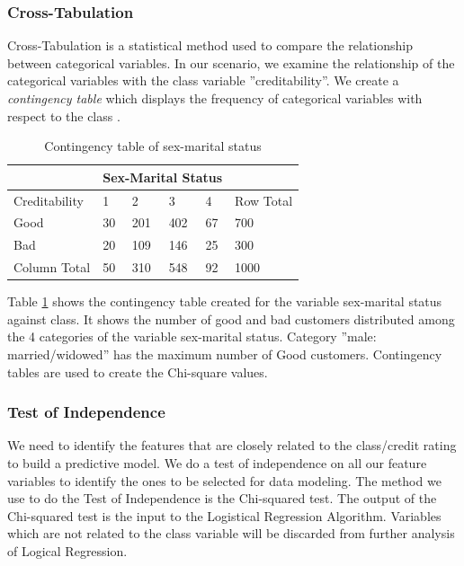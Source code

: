 \documentclass[sigconf]{acmart}
\begin{document}
\subsubsection{Cross-Tabulation}

Cross-Tabulation is a statistical method used to compare the relationship between categorical variables. In our scenario, we examine the relationship of the categorical variables with the class variable ''creditability''. We create a \emph{contingency table} which displays the frequency of categorical variables with respect to the class \cite{cross-tabulation}. 


\begin{table}[]
\centering
\caption{Contingency table of sex-marital status}
\label{tab:table6}
\begin{tabular}{|l|l|l|l|l|l|}
\hline
\multicolumn{1}{|c|}{} & \multicolumn{4}{l|}{Sex-Marital Status} &           \\ \hline
Creditability          & 1       & 2        & 3        & 4       & Row Total \\ \hline
Good                   & 30      & 201      & 402      & 67      & 700       \\ \hline
Bad                    & 20      & 109      & 146      & 25      & 300       \\ \hline
Column Total           & 50      & 310      & 548      & 92      & 1000      \\ \hline
\end{tabular}
\end{table}

Table \ref{tab:table6} shows the contingency table created for the variable sex-marital status against class. It shows the number of good and bad customers distributed among the 4 categories of the variable sex-marital status. Category ''male: married/widowed'' has the maximum number of Good customers. Contingency tables are used to create the Chi-square values.

\subsubsection{Test of Independence}

We need to identify the features that are closely related to the class/credit rating to build a predictive model. We do a test of independence on all our feature variables to identify the ones to be selected for data modeling. The method we use to do the Test of Independence is the Chi-squared test. The output of the Chi-squared test is the input to the Logistical Regression Algorithm. Variables which are not related to the class variable will be discarded from further analysis of Logical Regression. 
\end{document}

